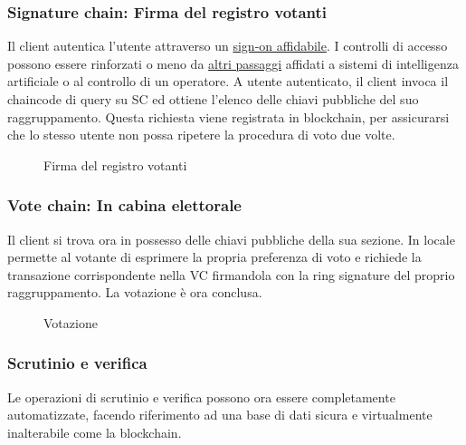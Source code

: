 		\subsubsection{Signature chain: Firma del registro votanti}
			Il client autentica l'utente attraverso un \hyperref[subsec:personalita_voto]{sign-on affidabile}. I controlli di accesso possono essere rinforzati o meno da \hyperref[subsec:liberta_voto]{altri passaggi} affidati a sistemi di intelligenza artificiale o al controllo di un operatore. A utente autenticato, il client invoca il chaincode di query su SC ed ottiene l'elenco delle chiavi pubbliche del suo raggruppamento. Questa richiesta viene registrata in blockchain, per assicurarsi che lo stesso utente non possa ripetere la procedura di voto due volte.
			\begin{figure}[ht]
				\centering
				\hspace{5mm}
				\caption{Firma del registro votanti}
				\label{fig:firma_voto}
			\end{figure}
			
		\subsubsection{Vote chain: In cabina elettorale}
			Il client si trova ora in possesso delle chiavi pubbliche della sua sezione. In locale permette al votante di esprimere la propria preferenza di voto e richiede la transazione corrispondente nella VC firmandola con la ring signature del proprio raggruppamento.
			La votazione è ora conclusa.
			\begin{figure}[ht]
				\centering
				\hspace{5mm}
				\caption{Votazione}
				\label{fig:votazione}
			\end{figure}
			
		\subsubsection{Scrutinio e verifica}
			Le operazioni di scrutinio e verifica possono ora essere completamente automatizzate, facendo riferimento ad una base di dati sicura e virtualmente inalterabile come la blockchain.

